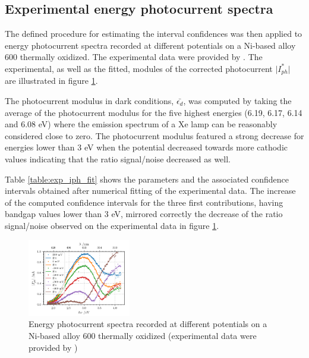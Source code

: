 \documentclass[10pt, 3p, sort&compress]{elsarticle}
\begin{document}
\subsection{Experimental energy photocurrent spectra}
The defined procedure for estimating the interval confidences was then applied to energy photocurrent spectra recorded at different potentials on a Ni-based alloy 600 thermally oxidized. The experimental data were provided by \citet{petit2013}. The experimental, as well as the fitted, modules of the corrected photocurrent $\vert I_{ph}^* \vert$ are illustrated in figure \ref{fig:exp_iph_fit}. 

The photocurrent modulus in dark conditions, $\bar{\epsilon _d}$, was computed by taking the average of the photocurrent modulus for the five highest energies (6.19, 6.17, 6.14 and 6.08 eV) where the emission spectrum of a Xe lamp can be reasonably considered close to zero. The photocurrent modulus featured a strong decrease for energies lower than 3 eV when the potential decreased towards more cathodic values indicating that the ratio signal/noise decreased as well. 

Table \ref{table:exp_iph_fit} shows the parameters and the associated confidence intervals obtained after numerical fitting of the experimental data. The increase of the computed confidence intervals for the three first contributions, having bandgap values lower than 3 eV, mirrored correctly the decrease of the ratio signal/noise observed on the experimental data in figure \ref{fig:exp_iph_fit}.

\begin{figure}[htbp]
\centering
\includegraphics[width=0.4\textwidth]{Abdel-600-All-Ipht.png}
\caption{Energy photocurrent spectra recorded at different potentials on a Ni-based alloy 600 thermally oxidized (experimental data were provided by \citet{petit2013})}
\label{fig:exp_iph_fit}
\end{figure}
\end{document}
